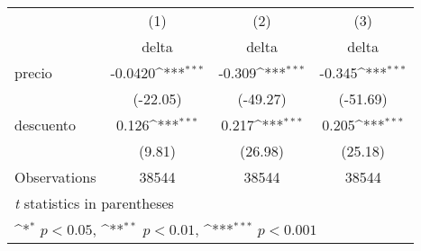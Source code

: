 {
\def\sym#1{\ifmmode^{#1}\else\(^{#1}\)\fi}
\begin{tabular}{l*{3}{c}}
\hline\hline
                    &\multicolumn{1}{c}{(1)}&\multicolumn{1}{c}{(2)}&\multicolumn{1}{c}{(3)}\\
                    &\multicolumn{1}{c}{delta}&\multicolumn{1}{c}{delta}&\multicolumn{1}{c}{delta}\\
\hline
precio              &     -0.0420\sym{***}&      -0.309\sym{***}&      -0.345\sym{***}\\
                    &    (-22.05)         &    (-49.27)         &    (-51.69)         \\
[1em]
descuento           &       0.126\sym{***}&       0.217\sym{***}&       0.205\sym{***}\\
                    &      (9.81)         &     (26.98)         &     (25.18)         \\
\hline
Observations        &       38544         &       38544         &       38544         \\
\hline\hline
\multicolumn{4}{l}{\footnotesize \textit{t} statistics in parentheses}\\
\multicolumn{4}{l}{\footnotesize \sym{*} \(p<0.05\), \sym{**} \(p<0.01\), \sym{***} \(p<0.001\)}\\
\end{tabular}
}
